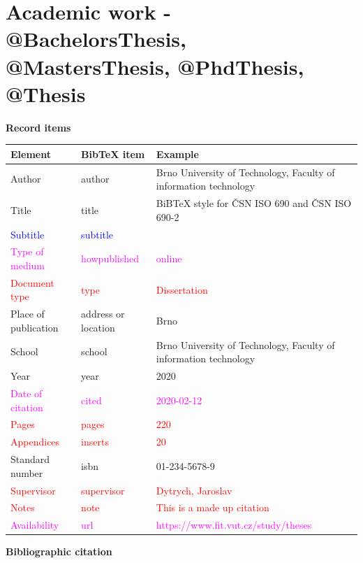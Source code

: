\section*{Academic work - @BachelorsThesis, @MastersThesis, @PhdThesis, @Thesis}
\label{pr-thesis}
\noindent \textbf{Record items}

\medskip

\begin{tabularx}{\linewidth}{X X X}
    Element & BibTeX item & Example\\\hline
    Author & author & Brno University of Technology, Faculty of information technology\\
    Title & title & BiBTeX style for ČSN ISO 690 and ČSN ISO 690-2\\
    \textcolor{blue}{Subtitle} & \textcolor{blue}{subtitle} & \\
    \textcolor{magenta}{Type of medium} & \textcolor{magenta}{howpublished} & \textcolor{magenta}{online}\\
    \textcolor{red}{Document type} & \textcolor{red}{type} & \textcolor{red}{Dissertation}\\
    Place of publication & address or location & Brno\\
    School & school & Brno University of Technology, Faculty of information technology\\
    Year & year & 2020\\
    \textcolor{magenta}{Date of citation} & \textcolor{magenta}{cited} & \textcolor{magenta}{2020-02-12}\\
    \textcolor{red}{Pages} & \textcolor{red}{pages} & \textcolor{red}{220}\\
    \textcolor{red}{Appendices} & \textcolor{red}{inserts} & \textcolor{red}{20}\\
    Standard number & isbn & 01-234-5678-9\\
    \textcolor{red}{Supervisor} & \textcolor{red}{supervisor} & \textcolor{red}{Dytrych, Jaroslav}\\
    \textcolor{red}{Notes} & \textcolor{red}{note} & \textcolor{red}{This is a made up citation}\\
    \textcolor{magenta}{Availability} & \textcolor{magenta}{url} & \textcolor{magenta}{https://www.fit.vut.cz/study/theses}\\
\end{tabularx}

\bigskip

\noindent \textbf{Bibliographic citation}

